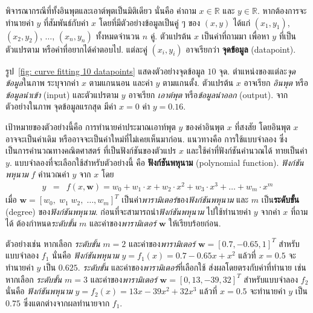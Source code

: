 พิจารณากรณีที่ทั้งอินพุตและเอาต์พุตเป็นมิติเดียว นั่นคือ คำถาม $x \in \mathbb{R}$
และ $y \in \mathbb{R}$.
หากต้องการจะทำนายค่า $y$ ที่สัมพันธ์กับค่า $x$
โดยที่มีตัวอย่างข้อมูลเป็นคู่ ๆ ของ $(x,y)$
ได้แก่ $(x_1, y_1)$, $(x_2, y_2)$, $\ldots$, $(x_n, y_n)$ %
ทั้งหมดจำนวน $n$ คู่.
ตัวแปรต้น $x$ เป็นค่าที่ถามมา
เพื่อหา $y$ ที่เป็นตัวแปรตาม หรือค่าที่อยากได้คำตอบไป.
แต่ละคู่ $(x_i, y_i)$ อาจเรียกว่า \textbf{จุดข้อมูล} (datapoint).

รูป~\ref{fig: curve fitting 10 datapoints}
แสดงตัวอย่างจุดข้อมูล $10$ จุด.
ตำแหน่งของแต่ละ\textit{จุดข้อมูล}ในภาพ
ระบุจากค่า $x$ ตามแกนนอน
และค่า $y$ ตามแกนตั้ง.
ตัวแปรต้น $x$ อาจเรียก \textit{อินพุต} หรือ\textit{ข้อมูลนำเข้า} (input)
และตัวแปรตาม $y$ อาจเรียก \textit{เอาต์พุต} หรือ\textit{ข้อมูลนำออก} (output).
จากตัวอย่างในภาพ จุดข้อมูลแรกสุด มีค่า $x = 0$ ค่า $y = 0.16$.

เป้าหมายของตัวอย่างนี้คือ การทำนายค่าประมาณเอาท์พุต $y$ ของค่าอินพุต $x$ ที่สงสัย 
โดยอินพุต $x$ อาจจะเป็นค่าเดิม หรืออาจจะเป็นค่าใหม่ที่ไม่เคยเห็นมาก่อน.
%
แนวทางคือ การใช้แบบจำลอง ซึ่งเป็นการคำนวณทางคณิตศาสตร์ ที่เป็นฟังก์ชันของตัวแปร $x$ และใช้ค่าที่ฟังก์ชันคำนวณได้ ทายเป็นค่า $y$.
แบบจำลองที่จะเลือกใช้สำหรับตัวอย่างนี้ คือ \textbf{ฟังก์ชันพหุนาม} (polynomial function).
\textit{ฟังก์ชันพหุนาม} $f$
คำนวณค่า $y$ จาก $x$ โดย
\begin{eqnarray}
y &=& f(x, \bm{w}) = w_0 + w_1 \cdot x + w_2 \cdot x^2 + w_3 \cdot x^3 + \ldots + w_m \cdot x^m
\label{eq: polynomial}
\end{eqnarray}
เมื่อ $\bm{w} = [w_0, \; w_1 \; w_2, \; \ldots, w_m]^T$ เป็นค่า\textit{พารามิเตอร์}ของ\textit{ฟังก์ชันพหุนาม} และ $m$ เป็น\textbf{ระดับขั้น} (degree) ของ\textit{ฟังก์ชันพหุนาม}.
ก่อนที่จะสามารถนำ\textit{ฟังก์ชันพหุนาม}
ไปใช้ทำนายค่า $y$ จากค่า $x$ ที่ถามได้
ต้องกำหนด\textit{ระดับขั้น} $m$
และค่าของ\textit{พารามิเตอร์} $\bm{w}$ ให้เรียบร้อยก่อน.

ตัวอย่างเช่น
หากเลือก
\textit{ระดับขั้น} $m = 2$
และค่าของ\textit{พารามิเตอร์} $\bm{w} = [0.7, -0.65, 1]^T$
สำหรับแบบจำลอง $f_1$ 
นั่นคือ \textit{ฟังก์ชันพหุนาม} $y = f_1(x) = 0.7 -0.65 x + x^2$
แล้วที่ $x = 0.5$
จะทำนายค่า $y$ เป็น $0.625$. 
\textit{ระดับขั้น} 
และค่าของ\textit{พารามิเตอร์}ที่เลือกใช้
ส่งผลโดยตรงกับค่าที่ทำนาย
เช่น
หากเลือก
\textit{ระดับขั้น} $m = 3$
และค่าของ\textit{พารามิเตอร์} $\bm{w} = [0, 13, -39, 32]^T$
สำหรับแบบจำลอง $f_2$
นั่นคือ \textit{ฟังก์ชันพหุนาม} $y = f_2(x) = 13 x -39 x^2 + 32 x^3$
แล้วที่ $x = 0.5$
จะทำนายค่า $y$ เป็น $0.75$ 
ซึ่งแตกต่างจากผลทำนายจาก $f_1$.

